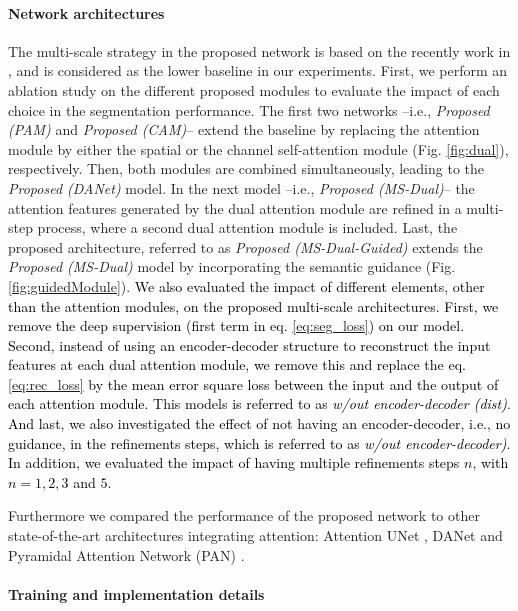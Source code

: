 \documentclass[journal]{IEEEtran}
\begin{document}
\paragraph*{\textbf{Network architectures}}
The multi-scale strategy in the proposed network is based on the recently work in \cite{wang18d}, and is considered as the lower baseline in our experiments. First, we perform an ablation study on the different proposed modules to evaluate the impact of each choice in the segmentation performance. The first two networks --i.e., \textit{Proposed (PAM)} and \textit{Proposed (CAM)}-- extend the baseline by replacing the attention module by either the spatial or the channel self-attention module (Fig. \ref{fig:dual}), respectively. Then, both modules are combined simultaneously, leading to the \textit{Proposed (DANet)} model. In the next model --i.e., \textit{Proposed (MS-Dual)}-- the attention features generated by the dual attention module are refined in a multi-step process, where a second dual attention module is included. Last, the proposed architecture, referred to as \textit{Proposed (MS-Dual-Guided)} extends the \textit{Proposed (MS-Dual)} model by incorporating the semantic guidance (Fig. \ref{fig:guidedModule}). \textcolor{black}{We also evaluated the impact of different elements, other than the attention modules, on the proposed multi-scale architectures. First, we remove the deep supervision (first term in eq. \ref{eq:seg_loss}) on our model. Second, instead of using an encoder-decoder structure to reconstruct the input features at each dual attention module, we remove this and replace the eq. \ref{eq:rec_loss} by the mean error square loss between the input and the output of each attention module. This models is referred to as \textit{w/out encoder-decoder (dist)}. And last, we also investigated the effect of not having an encoder-decoder, i.e., no guidance, in the refinements steps, which is referred to as \textit{w/out encoder-decoder)}. In addition, we evaluated the impact of having multiple refinements steps $n$, with $n=1,2,3$ and $5$. }

Furthermore we compared the performance of the proposed network to other state-of-the-art architectures integrating attention: Attention UNet \cite{schlemper2019attention}, DANet \cite{fu2018dual} and Pyramidal Attention Network (PAN) \cite{li2018pyramid}. 

\paragraph*{\textbf{Training and implementation details}}
\end{document}
